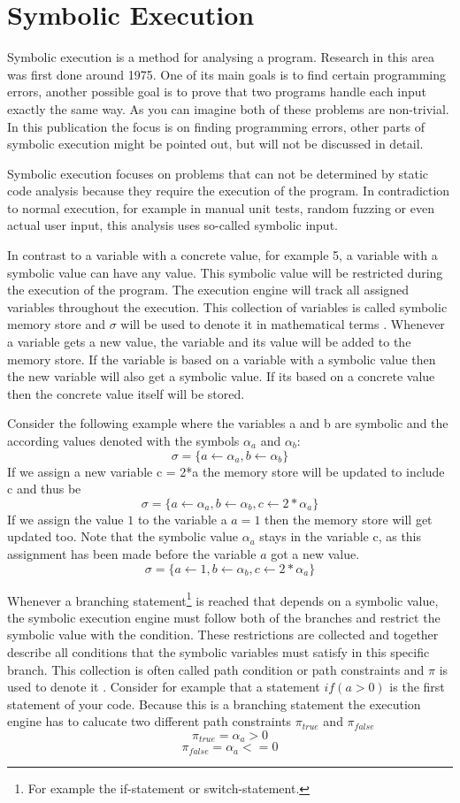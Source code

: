 \section{Symbolic Execution}\label{section:symbolic_execution}
Symbolic execution is a method for analysing a program. Research in this area was first done around 1975. One of its main goals is to find certain programming errors, another possible goal is to prove that two programs handle each input exactly the same way. As you can imagine both of these problems are non-trivial. In this publication the focus is on finding programming errors, other parts of symbolic execution might be pointed out, but will not be discussed in detail. 

Symbolic execution focuses on problems that can not be determined by static code analysis because they require the execution of the program. In contradiction to normal execution, for example in manual unit tests, random fuzzing or even actual user input, this analysis uses so-called symbolic input.

In contrast to a variable with a concrete value, for example 5, a variable with a symbolic value can have any value. This symbolic value will be restricted during the execution of the program. The execution engine will track all assigned variables throughout the execution. This collection of variables is called symbolic memory store and $\sigma$ will be used to denote it in mathematical terms \cite{SurveySymExec-CSUR18}.
Whenever a variable gets a new value, the variable and its value will be added to the memory store. If the variable is based on a variable with a symbolic value then the new variable will also get a symbolic value. If its based on a concrete value then the concrete value itself will be stored.

Consider the following example where the variables a and b are symbolic and the according values denoted with the symbols $\alpha_a$ and $\alpha_b$:
$$\sigma = \{a\gets \alpha_a , b \gets \alpha_b\}$$
If we assign a new variable c = 2*a the memory store will be updated to include c and thus be
$$\sigma = \{a\gets \alpha_a , b \gets \alpha_b, c \gets 2*\alpha_a\}$$
If we assign the value $1$ to the variable a $a = 1$ then the memory store will get updated too. Note that the symbolic value $\alpha_a$ stays in the variable c, as this assignment has been made before the variable $a$ got a new value.
$$\sigma = \{a\gets 1, b \gets \alpha_b, c \gets 2*\alpha_a\}$$


Whenever a branching statement\footnote{For example the if-statement or switch-statement.} is reached that depends on a symbolic value, the symbolic execution engine must follow both of the branches and restrict the symbolic value with the condition. These restrictions are collected and together describe all conditions that the symbolic variables must satisfy in this specific branch. This collection is often called path condition or path constraints and $\pi$ is used to denote it \cite{SurveySymExec-CSUR18}.
Consider for example that a statement $if (a > 0)$ is the first statement of your code. Because this is a branching statement the execution engine has to calucate two different path constraints $\pi_{true}$ and $\pi_{false}$
$$\pi_{true} = \alpha_a > 0$$
$$\pi_{false} = \alpha_a <= 0$$

